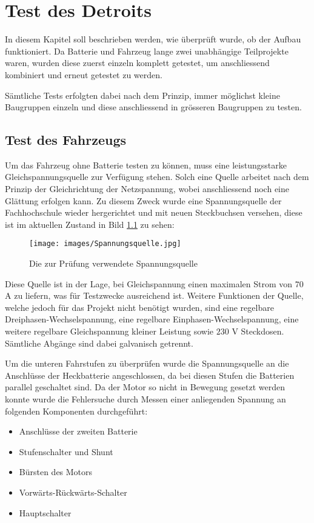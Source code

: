 \chapter{Test des Detroits}
In diesem Kapitel soll beschrieben werden, wie überprüft wurde, ob der Aufbau funktioniert. Da Batterie und Fahrzeug lange zwei unabhängige Teilprojekte waren, wurden diese zuerst einzeln komplett getestet, um anschliessend kombiniert und erneut getestet zu werden.

Sämtliche Tests erfolgten dabei nach dem Prinzip, immer möglichst kleine Baugruppen einzeln und diese anschliessend in grösseren Baugruppen zu testen.

\section{Test des Fahrzeugs}
Um das Fahrzeug ohne Batterie testen zu können, muss eine leistungsstarke Gleichspannungsquelle zur Verfügung stehen. Solch eine Quelle arbeitet nach dem Prinzip der Gleichrichtung der Netzspannung, wobei anschliessend noch eine Glättung erfolgen kann. Zu diesem Zweck wurde eine Spannungsquelle der Fachhochschule wieder hergerichtet und mit neuen Steckbuchsen versehen, diese ist im aktuellen Zustand in Bild \ref{fig:Spannungsquelle_blau} zu sehen:

\begin{figure}[h]
	\centering
		\texttt{[image: images/Spannungsquelle.jpg]}
	\caption{Die zur Prüfung verwendete Spannungsquelle}
	\label{fig:Spannungsquelle_blau}
\end{figure}

Diese Quelle ist in der Lage, bei Gleichspannung einen maximalen Strom von $70$ A zu liefern, was für Testzwecke ausreichend ist. Weitere Funktionen der Quelle, welche jedoch für das Projekt nicht benötigt wurden, sind eine regelbare Dreiphasen-Wechselspannung, eine regelbare Einphasen-Wechselspannung, eine weitere regelbare Gleichspannung kleiner Leistung sowie $230$ V Steckdosen. Sämtliche Abgänge sind dabei galvanisch getrennt.

Um die unteren Fahrstufen zu überprüfen wurde die Spannungsquelle an die Anschlüsse der Heckbatterie angeschlossen, da bei diesen Stufen die Batterien parallel geschaltet sind. Da der Motor so nicht in Bewegung gesetzt werden konnte wurde die Fehlersuche durch Messen einer anliegenden Spannung an folgenden Komponenten durchgeführt: \begin{itemize}
	\item Anschlüsse der zweiten Batterie
	\item Stufenschalter und Shunt
	\item Bürsten des Motors
	\item Vorwärts-Rückwärts-Schalter
	\item Hauptschalter
\end{itemize}

